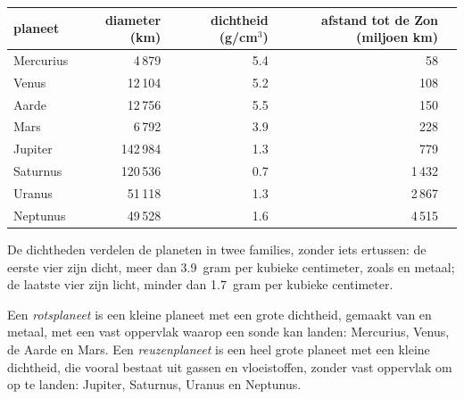 \begin{center}
\small
\begin{tabular}{lrrrr}
\hline
planeet & diameter (km) & dichtheid (g/cm$^3$) & afstand tot de Zon (miljoen km)\\
\hline
Mercurius & 4\,879 & 5.4 & 58\\
Venus & 12\,104 & 5.2 & 108\\
Aarde & 12\,756 & 5.5 & 150\\
Mars & 6\,792 & 3.9 & 228\\
\hline
Jupiter & 142\,984 & 1.3 & 779\\
Saturnus & 120\,536 & 0.7 & 1\,432\\
Uranus & 51\,118 & 1.3 & 2\,867\\
Neptunus & 49\,528 & 1.6 & 4\,515\\
\hline
\end{tabular}
\end{center}

De dichtheden verdelen de planeten in twee families, zonder iets ertussen:
de eerste vier zijn dicht, meer dan 3.9~gram per kubieke centimeter, zoals
 en metaal; de laatste vier zijn licht, minder dan 1.7~gram per
kubieke centimeter.

\begin{definition}\label{def:g6:earth-a-planet:planet-types}
Een \emph{rotsplaneet} is een kleine planeet met een
grote dichtheid, gemaakt van  en metaal, met een vast oppervlak
waarop een sonde kan landen: Mercurius, Venus, de Aarde en Mars. Een
\emph{reuzenplaneet} is een heel grote planeet met een
kleine dichtheid, die vooral bestaat uit gassen en vloeistoffen, zonder
vast oppervlak om op te landen: Jupiter, Saturnus, Uranus en Neptunus.
\end{definition}

